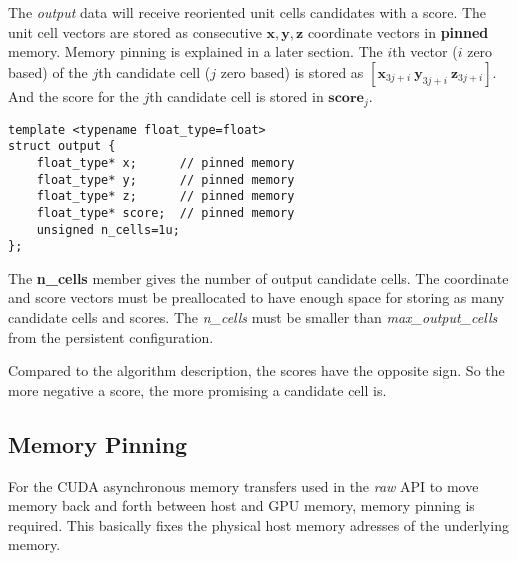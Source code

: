 \documentclass[a4paper,10pt]{article}
\newcommand{\vect}[1]{\mathbf{#1}}
\begin{document}
The \emph{output} data will receive reoriented unit cells candidates with a score. The unit cell vectors are stored as consecutive $\vect{x},\vect{y},\vect{z}$ coordinate vectors in \textbf{pinned} memory. Memory pinning is explained in a later section. The $i$th vector ($i$ zero based) of the $j$th candidate cell ($j$ zero based) is stored as $[\vect{x}_{3j+i}\ \vect{y}_{3j+i}\ \vect{z}_{3j+i}]$. And the score for the $j$th candidate cell is stored in $\vect{score}_j$.
%
\begin{lstlisting}
template <typename float_type=float>
struct output {
    float_type* x;      // pinned memory
    float_type* y;      // pinned memory
    float_type* z;      // pinned memory
    float_type* score;  // pinned memory
    unsigned n_cells=1u;
};
\end{lstlisting}
%
The \textbf{n\_cells} member gives the number of output candidate cells. The coordinate and score vectors must be preallocated to have enough space for storing as many candidate cells and scores. The \emph{n\_cells} must be smaller than \emph{max\_output\_cells} from the persistent configuration.

Compared to the algorithm description, the scores have the opposite sign. So the more negative a score, the more promising a candidate cell is.

\subsection{Memory Pinning}

For the CUDA asynchronous memory transfers used in the \emph{raw} API to move memory back and forth between host and GPU memory, memory pinning is required. This basically fixes the physical host memory adresses of the underlying memory.
\end{document}
